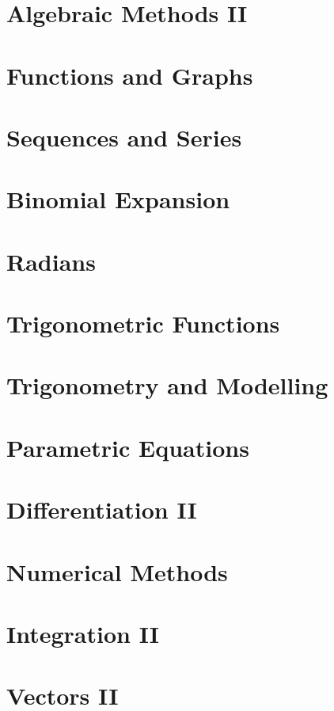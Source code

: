 \section{Algebraic Methods II} \label{algebraic_methods}
\newpage

\section{Functions and Graphs} \label{functions_and_graphs}
\newpage

\section{Sequences and Series} \label{sequences_and_series}
\newpage

\section{Binomial Expansion} \label{binomial_expansion}
\newpage

\section{Radians} \label{radians}
\newpage

\section{Trigonometric Functions} \label{trigonometric_functions}
\newpage

\section{Trigonometry and Modelling} \label{trigonometry_and_modelling}
\newpage

\section{Parametric Equations} \label{parametric_equations}
\newpage

\section{Differentiation II} \label{differentiation_ii}
\newpage

\section{Numerical Methods} \label{numerical_methods}
\newpage

\section{Integration II} \label{integration_ii}
\newpage

\section{Vectors II} \label{vectors_ii}
\newpage